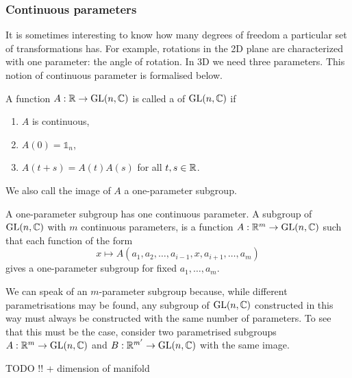 \subsubsection{Continuous parameters}
It is sometimes interesting to know how many degrees of freedom a particular set of transformations has. For example, rotations in the 2D plane are characterized with one parameter: the angle of rotation. In 3D we need three parameters. This notion of continuous parameter is formalised below.

\begin{definition}
A function $A : \mathbb{R} \to \operatorname{GL}(n, \mathbb{C})$ is called a  of $\operatorname{GL}(n, \mathbb{C})$ if
\begin{enumerate}
\item $A$ is continuous,
\item $A(0) = \mathbb{1}_n$,
\item $A(t+s) = A(t)A(s)$ for all $t,s \in \mathbb{R}$.
\end{enumerate}
We also call the image of $A$ a one-parameter subgroup.
\end{definition}

A one-parameter subgroup has one continuous parameter. A subgroup of $\operatorname{GL}(n, \mathbb{C})$ with $m$ continuous parameters, is a function $A : \mathbb{R}^m \to \operatorname{GL}(n, \mathbb{C})$ such that each function of the form
\[ x \mapsto A(a_1, a_2, \ldots , a_{i-1}, x, a_{i+1}, \ldots, a_m) \]
gives a one-parameter subgroup for fixed $a_1,\ldots, a_m$.

We can speak of an $m$-parameter subgroup because, while different parametrisations may be found, any subgroup of $\operatorname{GL}(n,\mathbb{C})$ constructed in this way must always be constructed with the same number of parameters. To see that this must be the case, consider two parametrised subgroups $A : \mathbb{R}^m \to \operatorname{GL}(n, \mathbb{C})$ and $B : \mathbb{R}^{m'} \to \operatorname{GL}(n, \mathbb{C})$ with the same image.

TODO !! + dimension of manifold

